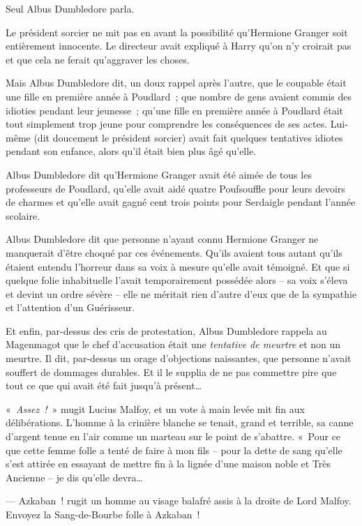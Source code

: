 Seul Albus Dumbledore parla.

Le président sorcier ne mit pas en avant la possibilité qu'Hermione Granger soit entièrement innocente.
Le directeur avait expliqué à Harry qu'on n'y croirait pas et que cela ne ferait qu'aggraver les choses.

Mais Albus Dumbledore dit, un doux rappel après l'autre, que le coupable était une fille en première année à Poudlard~; que nombre de gens avaient commis des idioties pendant leur jeunesse~; qu'une fille en première année à Poudlard était tout simplement trop jeune pour comprendre les conséquences de ses actes.
Lui-même (dit doucement le président sorcier) avait fait quelques tentatives idiotes pendant son enfance, alors qu'il était bien plus âgé qu'elle.

Albus Dumbledore dit qu'Hermione Granger avait été aimée de tous les professeurs de Poudlard, qu'elle avait aidé quatre Poufsouffle pour leurs devoirs de charmes et qu'elle avait gagné cent trois points pour Serdaigle pendant l'année scolaire.

Albus Dumbledore dit que personne n'ayant connu Hermione Granger ne manquerait d'être choqué par ces événements.
Qu'ils avaient tous autant qu'ils étaient entendu l'horreur dans sa voix à mesure qu'elle avait témoigné.
Et que si quelque folie inhabituelle l'avait temporairement possédée alors -- sa voix s'éleva et devint un ordre sévère -- elle ne méritait rien d'autre d'eux que de la sympathie et l'attention d'un Guérisseur.

Et enfin, par-dessus des cris de protestation, Albus Dumbledore rappela au Magenmagot que le chef d'accusation était une \emph{tentative de meurtre} et non un meurtre.
Il dit, par-dessus un orage d'objections naissantes, que personne n'avait souffert de dommages durables.
Et il le supplia de ne pas commettre pire que tout ce que qui avait été fait jusqu'à présent…

«~\emph{Assez~!}~» mugit Lucius Malfoy, et un vote à main levée mit fin aux délibérations.
L'homme à la crinière blanche se tenait, grand et terrible, sa canne d'argent tenue en l'air comme un marteau sur le point de s'abattre.
«~Pour ce que cette femme folle a tenté de faire à mon fils -- pour la dette de sang qu'elle s'est attirée en essayant de mettre fin à la lignée d'une maison noble et Très Ancienne -- je dis qu'elle devra…

--- Azkaban~! rugit un homme au visage balafré assis à la droite de Lord Malfoy.
Envoyez la Sang-de-Bourbe folle à Azkaban~!

